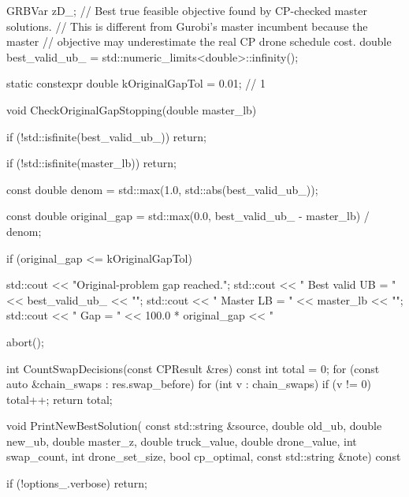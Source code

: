 {{{            GRBVar zD_;
            // Best true feasible objective found by CP-checked master solutions.
            // This is different from Gurobi's master incumbent because the master
            // objective may underestimate the real CP drone schedule cost.
            double best_valid_ub_ = std::numeric_limits<double>::infinity();

            static constexpr double kOriginalGapTol = 0.01; // 1%

            void CheckOriginalGapStopping(double master_lb)
            {
                if (!std::isfinite(best_valid_ub_))
                {
                    return;
                }

                if (!std::isfinite(master_lb))
                {
                    return;
                }

                const double denom = std::max(1.0, std::abs(best_valid_ub_));

                const double original_gap =
                    std::max(0.0, best_valid_ub_ - master_lb) / denom;

                if (original_gap <= kOriginalGapTol)
                {
                    std::cout << "\n[STOP] Original-problem gap reached.\n";
                    std::cout << "       Best valid UB = " << best_valid_ub_ << "\n";
                    std::cout << "       Master LB     = " << master_lb << "\n";
                    std::cout << "       Gap           = "
                              << 100.0 * original_gap << "%

                    abort();
                }
            }

            int CountSwapDecisions(const CPResult &res) const
            {
                int total = 0;
                for (const auto &chain_swaps : res.swap_before)
                {
                    for (int v : chain_swaps)
                    {
                        if (v != 0)
                        {
                            total++;
                        }
                    }
                }
                return total;
            }

            void PrintNewBestSolution(
                const std::string &source,
                double old_ub,
                double new_ub,
                double master_z,
                double truck_value,
                double drone_value,
                int swap_count,
                int drone_set_size,
                bool cp_optimal,
                const std::string &note) const
            {
                if (!options_.verbose)
                {
                    return;
                }

}}}}
